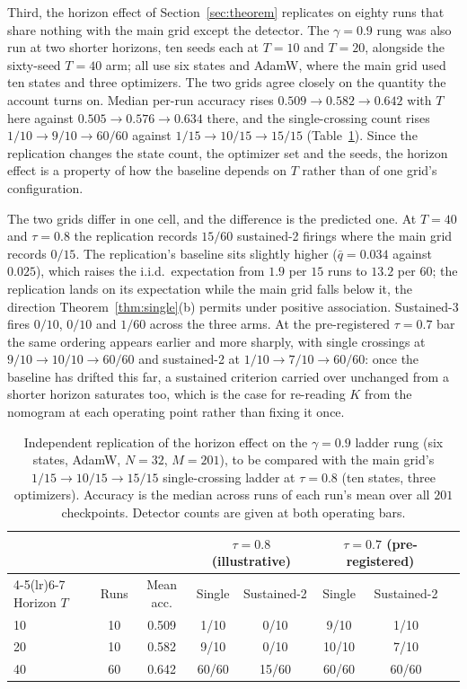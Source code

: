 \documentclass[11pt]{article}
\theoremstyle{plain}
\theoremstyle{definition}
\begin{document}
Third, the horizon effect of Section~\ref{sec:theorem} replicates on eighty runs that
share nothing with the main grid except the detector. The $\gamma=0.9$ rung was also run
at two shorter horizons, ten seeds each at $T=10$ and $T=20$, alongside the sixty-seed
$T=40$ arm; all use six states and AdamW, where the main grid used ten states and three
optimizers. The two grids agree closely on the quantity the account turns on. Median
per-run accuracy rises $0.509\to0.582\to0.642$ with $T$ here against
$0.505\to0.576\to0.634$ there, and the single-crossing count rises
$1/10\to9/10\to60/60$ against $1/15\to10/15\to15/15$ (Table~\ref{tab:horizonrep}). Since
the replication changes the state count, the optimizer set and the seeds, the horizon
effect is a property of how the baseline depends on $T$ rather than of one grid's
configuration.

The two grids differ in one cell, and the difference is the predicted one. At $T=40$ and
$\tau=0.8$ the replication records $15/60$ sustained-2 firings where the main grid records
$0/15$. The replication's baseline sits slightly higher ($\bar q=0.034$ against $0.025$),
which raises the i.i.d.\ expectation from $1.9$ per $15$ runs to $13.2$ per $60$; the
replication lands on its expectation while the main grid falls below it, the direction
Theorem~\ref{thm:single}(b) permits under positive association. Sustained-3 fires $0/10$,
$0/10$ and $1/60$ across the three arms. At the pre-registered $\tau=0.7$ bar the same
ordering appears earlier and more sharply, with single crossings at
$9/10\to10/10\to60/60$ and sustained-2 at $1/10\to7/10\to60/60$: once the baseline has
drifted this far, a sustained criterion carried over unchanged from a shorter horizon
saturates too, which is the case for re-reading $K$ from the nomogram at each operating
point rather than fixing it once.

\begin{table}[htbp]
\centering
\caption{Independent replication of the horizon effect on the $\gamma=0.9$ ladder rung
(six states, AdamW, $N=32$, $M=201$), to be compared with the main grid's
$1/15\to10/15\to15/15$ single-crossing ladder at $\tau=0.8$ (ten states, three
optimizers). Accuracy is the median across runs of each run's mean over all $201$
checkpoints. Detector counts are given at both operating bars.}
\label{tab:horizonrep}
\small
\begin{tabular}{lccccccc}
\toprule
& & & \multicolumn{2}{c}{$\tau=0.8$ (illustrative)} & \multicolumn{2}{c}{$\tau=0.7$ (pre-registered)} \\
\cmidrule(lr){4-5}\cmidrule(lr){6-7}
Horizon $T$ & Runs & Mean acc. & Single & Sustained-2 & Single & Sustained-2 \\
\midrule
10 & 10 & 0.509 & 1/10  & 0/10  & 9/10  & 1/10 \\
20 & 10 & 0.582 & 9/10  & 0/10  & 10/10 & 7/10 \\
40 & 60 & 0.642 & 60/60 & 15/60 & 60/60 & 60/60 \\
\bottomrule
\end{tabular}
\end{table}
\end{document}
